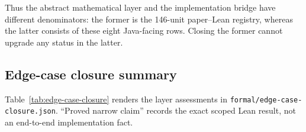 Thus the abstract mathematical layer and the implementation bridge have
different denominators: the former is the 146-unit paper--Lean registry,
whereas the latter consists of these eight Java-facing rows.  Closing the
former cannot upgrade any status in the latter.

\subsection{Edge-case closure summary}
\label{app:edge-case-closure}

Table~\ref{tab:edge-case-closure} renders the layer assessments in
\texttt{formal/edge-case-closure.json}.  ``Proved narrow claim'' records the
exact scoped Lean result, not an end-to-end implementation fact.

\begingroup\scriptsize
\setlength{\tabcolsep}{3pt}
